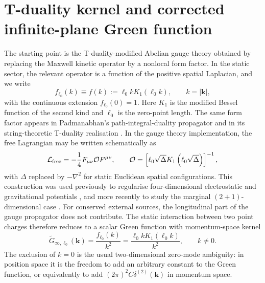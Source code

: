 \documentclass[nopacs,amsmath,amsfonts,amssymb,aps,superscriptaddress]{revtex4}
\begin{document}
\section{T-duality kernel and corrected infinite-plane Green function}

The starting point is the T-duality-modified Abelian gauge theory obtained by replacing the Maxwell kinetic operator by a nonlocal form factor. In the static sector, the relevant operator is a function of the positive spatial Laplacian, and we write
\begin{equation}
  f_{\ell_0}(k)\equiv f(k):=\ell_0 k K_1(\ell_0 k),
  \qquad k=|\mathbf k|,
\end{equation}
with the continuous extension $f_{\ell_0}(0)=1$. Here $K_1$ is the modified Bessel function of the second kind and $\ell_0$ is the zero-point length. The same form factor appears in Padmanabhan's path-integral-duality propagator and in its string-theoretic T-duality realisation \cite{Padmanabhan1997, SmailagicSpallucciPadmanabhan2003, FontaniniSpallucciPadmanabhan2006}. In the gauge theory implementation, the free Lagrangian may be written schematically as
\begin{equation}
  \mathcal L_{\rm free}=-\frac{1}{4} F_{\mu\nu}\mathcal O F^{\mu\nu},\qquad
  \mathcal O=\left[\ell_0\sqrt{\Delta} K_1\left(\ell_0\sqrt{\Delta}\right)\right]^{-1},
\end{equation}
with $\Delta$ replaced by $-\nabla^2$ for static Euclidean spatial configurations. This construction was used previously to regularise four-dimensional electrostatic and gravitational potentials \cite{NicoliniSpallucciWondrak2019, GaeteNicolini2022}, and more recently to study the marginal $(2+1)$-dimensional case \cite{GaeteNicolini2026}. For conserved external sources, the longitudinal part of the gauge propagator does not contribute. The static interaction between two point charges therefore reduces to a scalar Green function with momentum-space kernel
\begin{equation}
  \widetilde G_{\infty,\ell_0}(\mathbf k)
  =\frac{f_{\ell_0}(k)}{k^2}
  =\frac{\ell_0 k K_1(\ell_0 k)}{k^2},
  \qquad k\neq 0.
\end{equation}
The exclusion of $k=0$ is the usual two-dimensional zero-mode ambiguity: in position space it is the freedom to add an arbitrary constant to the Green function, or equivalently to add $(2\pi)^2 C\delta^{(2)}(\mathbf k)$ in momentum space.
\end{document}
